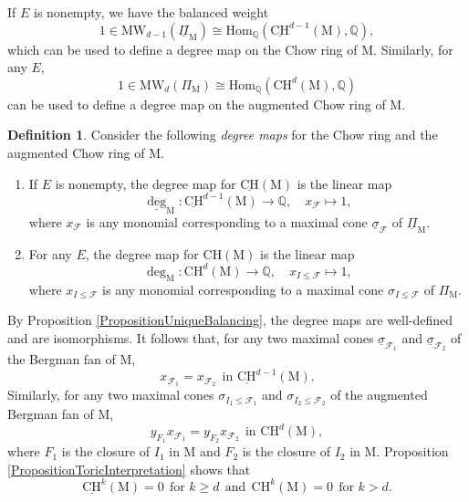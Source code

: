 \documentclass[11pt,reqno]{amsart}
\theoremstyle{definition}
\newtheorem{definition}[theorem]{Definition}
\theoremstyle{remark}
\renewcommand{\(}{\left(}
\renewcommand{\)}{\right)}
\newcommand{\<}{\left<}
\renewcommand{\>}{\right>}
\begin{document}
If $E$ is nonempty, we have the balanced weight
\[
1 \in \mathrm{MW}_{d-1}(\underline{\Pi}_\mathrm{M}) \cong \text{Hom}_\mathbb{Q}(\underline{\mathrm{CH}}^{d-1}(\mathrm{M}),\mathbb{Q}),
\]
which can be used to define a degree map on the Chow ring of $\mathrm{M}$.
Similarly, for any $E$, %
\[
1 \in \mathrm{MW}_{d}(\Pi_\mathrm{M}) \cong \text{Hom}_\mathbb{Q}(\mathrm{CH}^{d}(\mathrm{M}),\mathbb{Q})
\]
can be used to define a degree map on the augmented Chow ring of $\mathrm{M}$.

\begin{definition}\label{DefinitionDegreemap}
Consider the following \emph{degree maps} for the Chow ring and the augmented Chow ring of $\mathrm{M}$.
\begin{enumerate}[(1)]\itemsep 5pt
\item If $E$ is nonempty, the degree map for $\underline{\mathrm{CH}}(\mathrm{M})$ is the linear map
\[
\underline{\deg}_\mathrm{M}:  \underline{\mathrm{CH}}^{d-1}(\mathrm{M}) \longrightarrow \mathbb{Q}, \quad x_{\mathscr{F}} \longmapsto 1,
\]
where $x_\mathscr{F}$ is any monomial corresponding to a maximal cone $\underline{\sigma}_\mathscr{F}$ of $\underline{\Pi}_\mathrm{M}$.
\item For any $E$, the degree map for $\mathrm{CH}(\mathrm{M})$ is the linear map
\[
\deg_\mathrm{M}:  \mathrm{CH}^{d}(\mathrm{M}) \longrightarrow \mathbb{Q}, \quad x_{I \le \mathscr{F}} \longmapsto 1,
\]
where $x_{I\le \mathscr{F}}$ is any monomial corresponding to a maximal cone $\sigma_{I\le \mathscr{F}}$ of $\Pi_\mathrm{M}$.
\end{enumerate}
\end{definition}

By Proposition \ref{PropositionUniqueBalancing}, the degree maps are well-defined and are isomorphisms.
It follows that, for any two maximal cones $\underline{\sigma}_{\mathscr{F}_1}$ and $\underline{\sigma}_{\mathscr{F}_2}$ of the Bergman fan of $\mathrm{M}$, 
\[
x_{\mathscr{F}_1}=x_{\mathscr{F}_2} \ \ \text{in $\underline{\mathrm{CH}}^{d-1}(\mathrm{M})$}.
\]
Similarly, for any two maximal cones $\sigma_{I_1 \le \mathscr{F}_1}$ and $\sigma_{I_2 \le \mathscr{F}_2}$ of the augmented Bergman fan of $\mathrm{M}$,
\[
y_{F_1} x_{\mathscr{F}_1}=y_{F_2}x_{\mathscr{F}_2} \ \ \text{in $\mathrm{CH}^d(\mathrm{M})$},
\]
where $F_1$ is the closure of $I_1$ in $\mathrm{M}$ and $F_2$ is the closure of $I_2$ in $\mathrm{M}$.
Proposition \ref{PropositionToricInterpretation} shows that
\[
\underline{\mathrm{CH}}^k(\mathrm{M})=0 \ \ \text{for $k \ge d$} \ \  
\text{and} \ \ 
\mathrm{CH}^k(\mathrm{M})=0 \ \ \text{for $k > d$.}
\]
\end{document}
